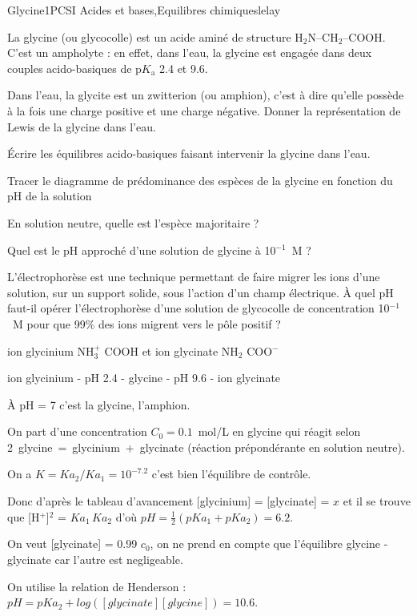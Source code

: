 \begin{exercise}{Glycine}{1}{PCSI}
{Acides et bases,Equilibres chimiques}{lelay}

La glycine (ou glycocolle) est un acide aminé de structure H$_2$N--CH$_2$--COOH.  C'est un ampholyte : en effet, dans l'eau, la glycine est engagée dans deux couples acido-basiques de $\text{p}K_\text{a}$ 2.4 et 9.6.

\begin{questions}
    \question Dans l'eau, la glycite est un zwitterion (ou amphion), c'est à dire qu'elle possède à la fois une charge positive et une charge négative. Donner la représentation de Lewis de la glycine dans l'eau.

    \question Écrire les équilibres acido-basiques faisant intervenir la glycine dans l'eau.

    \question Tracer le diagramme de prédominance des espèces de la glycine en fonction du pH de la solution

    \question En solution neutre, quelle est l'espèce majoritaire ?
    
    \question Quel est le pH approché d'une solution de glycine à 10$^{-1}$~M ?
    
    \question L'électrophorèse est une technique permettant de faire migrer les ions d’une solution, sur un support solide, sous l’action d’un champ électrique. À quel pH faut-il opérer l’électrophorèse d’une solution de glycocolle de concentration 10$^{-1}$~M pour que 99\% des ions migrent vers le pôle positif ?
    
\end{questions}
\end{exercise}

\begin{solution}
\begin{questions}

    \question ion glycinium NH$_3^+$ COOH et ion glycinate NH$_2$ COO$^-$
    
    \question ion glycinium - pH 2.4 - glycine - pH 9.6 - ion glycinate
    
    \question À pH = 7 c'est la glycine, l'amphion.
    
    \question On part d'une concentration $C_0 = 0.1$~mol/L en glycine qui réagit selon 2~glycine~=~glycinium~+~glycinate (réaction prépondérante en solution neutre).
    
    On a $K = Ka_2 / Ka_1 = 10^{-7.2}$ c'est bien l'équilibre de contrôle.
    
    Donc d'après le tableau d'avancement [glycinium] = [glycinate] = $x$ et il se trouve que [H$^+$]$^2$ = $Ka_1 \, Ka_2$ d'où $pH = \frac12(pKa_1 + pKa_2) = 6.2$.
    
    \question On veut [glycinate] = 0.99 $c_0$, on ne prend en compte que l'équilibre glycine - glycinate car l'autre est negligeable. 
    
    On utilise la relation de Henderson : $pH = pKa_2 + log([glycinate][glycine]) = 10.6$.
    
\end{questions}
\end{solution}

